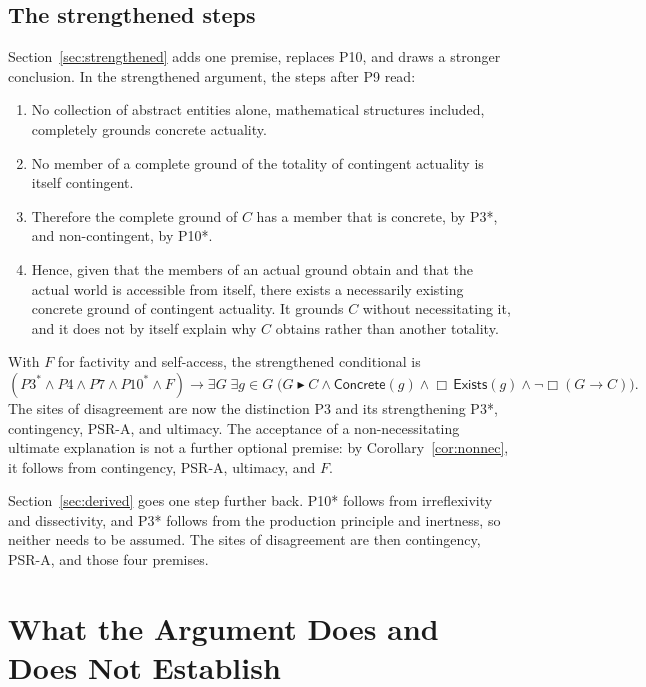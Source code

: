\documentclass[11pt,letterpaper]{article}
\theoremstyle{plain}
\theoremstyle{definition}
\newcommand{\grounds}{\blacktriangleright}
\begin{document}
\subsection{The strengthened steps}

Section~\ref{sec:strengthened} adds one premise, replaces P10, and draws a stronger conclusion. In the strengthened argument, the steps after P9 read:
\begin{enumerate}[leftmargin=3.8em]
  \item[\textbf{P3*.}] No collection of abstract entities alone, mathematical structures included, completely grounds concrete actuality.
  \item[\textbf{P10*.}] No member of a complete ground of the totality of contingent actuality is itself contingent.
  \item[\textbf{P11*.}] Therefore the complete ground of $C$ has a member that is concrete, by P3*, and non-contingent, by P10*.
  \item[\textbf{P12*.}] Hence, given that the members of an actual ground obtain and that the actual world is accessible from itself, there exists a necessarily existing concrete ground of contingent actuality. It grounds $C$ without necessitating it, and it does not by itself explain why $C$ obtains rather than another totality.
\end{enumerate}
With $F$ for factivity and self-access, the strengthened conditional is
\[
  (P3^{*} \land P4 \land P7 \land P10^{*} \land F) \rightarrow
  \exists G\; \exists g \in G\;\bigl(G \grounds C \land \mathsf{Concrete}(g) \land \Box\,\mathsf{Exists}(g) \land \neg\Box(G \to C)\bigr).
\]
The sites of disagreement are now the distinction P3 and its strengthening P3*, contingency, PSR-A, and ultimacy. The acceptance of a non-necessitating ultimate explanation is not a further optional premise: by Corollary~\ref{cor:nonnec}, it follows from contingency, PSR-A, ultimacy, and $F$.

Section~\ref{sec:derived} goes one step further back. P10* follows from irreflexivity and dissectivity, and P3* follows from the production principle and inertness, so neither needs to be assumed. The sites of disagreement are then contingency, PSR-A, and those four premises.

\section{What the Argument Does and Does Not Establish}
\label{sec:scope}
\end{document}
